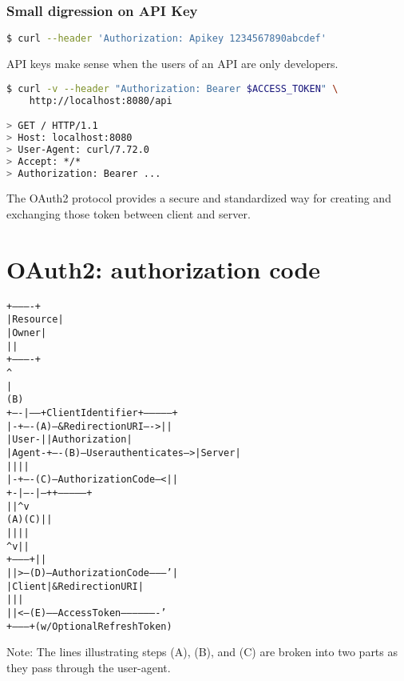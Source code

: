 \documentclass[11pt]{style}
\begin{document}
\subsubsection{Small digression on API Key}
\begin{lstlisting}[language=bash]
$ curl --header 'Authorization: Apikey 1234567890abcdef'
\end{lstlisting}
API keys make sense when the users of an API are only developers.


\begin{lstlisting}[language=bash]
$ curl -v --header "Authorization: Bearer $ACCESS_TOKEN" \
    http://localhost:8080/api

> GET / HTTP/1.1
> Host: localhost:8080
> User-Agent: curl/7.72.0
> Accept: */*
> Authorization: Bearer ...
\end{lstlisting}

The OAuth2 protocol provides a secure and standardized way for creating and exchanging those token between client and server.


\section{OAuth2: authorization code}
\begin{alltt}
     +----------+
     | Resource |
     |   Owner  |
     |          |
     +----------+
          ^
          |
         (B)
     +----|-----+          Client Identifier      +---------------+
     |         -+----(A)-- & Redirection URI ---->|               |
     |  User-   |                                 | Authorization |
     |  Agent  -+----(B)-- User authenticates --->|     Server    |
     |          |                                 |               |
     |         -+----(C)-- Authorization Code ---<|               |
     +-|----|---+                                 +---------------+
       |    |                                         ^      v
      (A)  (C)                                        |      |
       |    |                                         |      |
       ^    v                                         |      |
     +---------+                                      |      |
     |         |>---(D)-- Authorization Code ---------'      |
     |  Client |          & Redirection URI                  |
     |         |                                             |
     |         |<---(E)----- Access Token -------------------'
     +---------+       (w/ Optional Refresh Token)

 \end{alltt}
Note: The lines illustrating steps (A), (B), and (C) are broken into
two parts as they pass through the user-agent.
\end{document}
